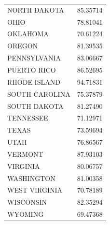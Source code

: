 \documentclass[
  letterpaper,
  DIV=11,
  numbers=noendperiod]{scrartcl}
\begin{document}
\begin{longtable}[]{@{}lr@{}}
NORTH DAKOTA & 85.35714 \\
OHIO & 78.81041 \\
OKLAHOMA & 70.61224 \\
OREGON & 81.39535 \\
PENNSYLVANIA & 83.06667 \\
PUERTO RICO & 86.52695 \\
RHODE ISLAND & 94.71831 \\
SOUTH CAROLINA & 75.37879 \\
SOUTH DAKOTA & 81.27490 \\
TENNESSEE & 71.12971 \\
TEXAS & 73.59694 \\
UTAH & 76.86567 \\
VERMONT & 87.93103 \\
VIRGINIA & 80.06757 \\
WASHINGTON & 81.00358 \\
WEST VIRGINIA & 70.78189 \\
WISCONSIN & 82.35294 \\
WYOMING & 69.47368 \\
\end{longtable}
\end{document}

